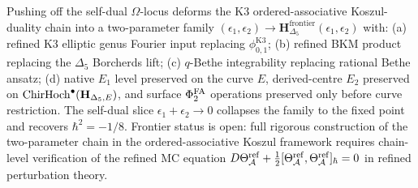 \begin{remark}
\label{rem:oackdf-refined-summary}
Pushing off the self-dual $\Omega$-locus deforms the K3
ordered-associative Koszul-duality chain into a two-parameter family
$(\epsilon_1, \epsilon_2) \to \mathbf H_{\Delta_5}^{\mathrm{frontier}}
(\epsilon_1, \epsilon_2)$ with: (a) refined K3 elliptic genus
Fourier input replacing $\phi_{0,1}^{\mathrm K3}$; (b) refined BKM
product replacing the $\Delta_5$ Borcherds lift; (c) $q$-Bethe
integrability replacing rational Bethe ansatz; (d) native $E_1$ level
preserved on the curve $E$, derived-centre $E_2$ preserved on
$\mathrm{ChirHoch}^\bullet(\mathbf H_{\Delta_5,E})$, and surface $\Phi^{\mathrm{FA}}_2$
operations preserved only before curve restriction. The self-dual slice $\epsilon_1 + \epsilon_2 \to 0$
collapses the family to the fixed point and recovers
$\hbar^2 = -1/8$. Frontier status is open: full rigorous construction
of the two-parameter chain in the ordered-associative Koszul framework
requires chain-level verification of the refined MC equation
$D \Theta^{\mathrm{ref}}_{\mathcal{A}} + \tfrac12 [\Theta^{\mathrm{ref}}_{\mathcal{A}},
\Theta^{\mathrm{ref}}_{\mathcal{A}}]_\hbar = 0$ in refined perturbation theory.
\end{remark}
